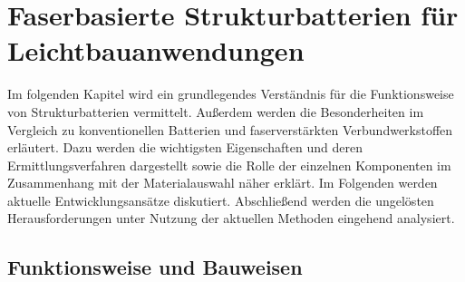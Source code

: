 \chapter{Faserbasierte Strukturbatterien für Leichtbauanwendungen}

Im folgenden Kapitel wird ein grundlegendes Verständnis für die Funktionsweise von Strukturbatterien vermittelt. Außerdem werden die Besonderheiten im Vergleich zu konventionellen Batterien und faserverstärkten Verbundwerkstoffen erläutert. Dazu werden die wichtigsten Eigenschaften und deren Ermittlungsverfahren dargestellt sowie die Rolle der einzelnen Komponenten im Zusammenhang mit der Materialauswahl näher erklärt. Im Folgenden werden aktuelle Entwicklungsansätze diskutiert. Abschließend werden die ungelösten Herausforderungen unter Nutzung der aktuellen Methoden eingehend analysiert.

\section{Funktionsweise und Bauweisen} 

